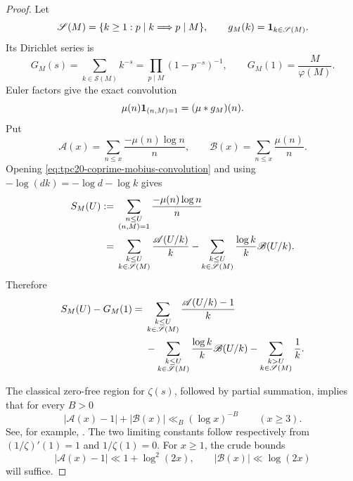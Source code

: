 \begin{proof}
Let
\[
 \mathscr S(M)=\{k\ge1:p\mid k\Longrightarrow p\mid M\},
 \qquad
 g_M(k)=\mathbf 1_{k\in\mathscr S(M)}.
\]
Its Dirichlet series is
\begin{equation}
 G_M(s)=\sum_{k\in\mathscr S(M)}k^{-s}
 =\prod_{p\mid M}(1-p^{-s})^{-1},
 \qquad
 G_M(1)=\frac{M}{\varphi(M)}.
 \label{eq:tpc20-GM}
\end{equation}
Euler factors give the exact convolution
\begin{equation}
 \mu(n)\mathbf 1_{(n,M)=1}=(\mu*g_M)(n).
 \label{eq:tpc20-coprime-mobius-convolution}
\end{equation}
Put
\[
 \mathscr A(x)=\sum_{n\le x}\frac{-\mu(n)\log n}{n},
 \qquad
 \mathscr B(x)=\sum_{n\le x}\frac{\mu(n)}n.
\]
Opening \eqref{eq:tpc20-coprime-mobius-convolution} and using
\(-\log(dk)=-\log d-\log k\) gives
\begin{align}
 S_M(U)
 :={}&\sum_{\substack{n\le U\\(n,M)=1}}
 \frac{-\mu(n)\log n}{n}
 \notag\\
 ={}&\sum_{\substack{k\le U\\k\in\mathscr S(M)}}
 \frac{\mathscr A(U/k)}k
 -\sum_{\substack{k\le U\\k\in\mathscr S(M)}}
 \frac{\log k}{k}\mathscr B(U/k).
 \label{eq:tpc20-calibration-convolution}
\end{align}
Therefore
\begin{align}
 S_M(U)-G_M(1)
 ={}&\sum_{\substack{k\le U\\k\in\mathscr S(M)}}
 \frac{\mathscr A(U/k)-1}{k}
 \notag\\
 &-\sum_{\substack{k\le U\\k\in\mathscr S(M)}}
 \frac{\log k}{k}\mathscr B(U/k)
 -\sum_{\substack{k>U\\k\in\mathscr S(M)}}\frac1k.
 \label{eq:tpc20-calibration-error-split}
\end{align}

The classical zero-free region for \(\zeta(s)\), followed by partial
summation, implies that for every \(B>0\)
\begin{equation}
 |\mathscr A(x)-1|+|\mathscr B(x)|
 \ll_B(\log x)^{-B}\qquad(x\ge3).
 \label{eq:tpc20-classical-mobius-input}
\end{equation}
See, for example, \citet[Chapter~5]{IwaniecKowalski2004}.
The two limiting constants follow respectively from
\((1/\zeta)'(1)=1\) and \(1/\zeta(1)=0\).  For \(x\ge1\), the crude
bounds
\begin{equation}
 |\mathscr A(x)-1|\ll1+\log^2(2x),
 \qquad
 |\mathscr B(x)|\ll\log(2x)
 \label{eq:tpc20-crude-mobius}
\end{equation}
will suffice.


\end{proof}
